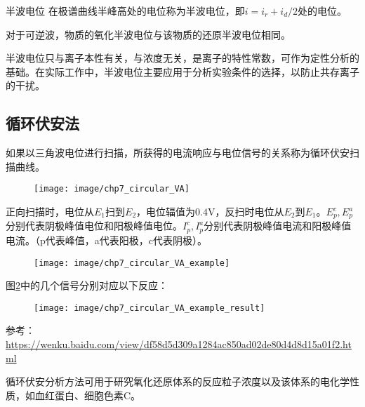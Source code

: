 \begin{definition*}{半波电位}{}
	在极谱曲线半峰高处的电位称为半波电位，即$i=i_r+i_d/2$处的电位。
	
	对于可逆波，物质的氧化半波电位与该物质的还原半波电位相同。	
\end{definition*}

半波电位只与离子本性有关，与浓度无关，是离子的特性常数，可作为定性分析的基础。在实际工作中，半波电位主要应用于分析实验条件的选择，以防止共存离子的干扰。

\subsection{循环伏安法}
如果以三角波电位进行扫描，所获得的电流响应与电位信号的关系称为循环伏安扫描曲线。
\begin{figure}[!h]
	\centering
	\texttt{[image: image/chp7\_circular\_VA]}
	\label{fig:chp7circularva}
\end{figure}

正向扫描时，电位从$E_1$扫到$E_2$，电位辐值为$0.4\mathrm{V}$，反扫时电位从$E_2$到$E_1$。$E_p^c,E_p^a$分别代表阴极峰值电位和阳极峰值电位。$I_p^c,I_p^a$分别代表阴极峰值电流和阳极峰值电流。（p代表峰值，a代表阳极，c代表阴极）。

\begin{example}
	\begin{figure}[!h]
		\centering
		\texttt{[image: image/chp7\_circular\_VA\_example]}
		\caption{}
		\label{fig:chp7circularvaexample}
	\end{figure}

	图\ref{fig:chp7circularvaexample}中的几个信号分别对应以下反应：
	
	\begin{figure}[!h]
		\centering
		\texttt{[image: image/chp7\_circular\_VA\_example\_result]}
		\label{fig:chp7circularvaexampleresult}
	\end{figure}
	
	参考：\url{https://wenku.baidu.com/view/df58d5d309a1284ac850ad02de80d4d8d15a01f2.html}
\end{example}
循环伏安分析方法可用于研究氧化还原体系的反应粒子浓度以及该体系的电化学性质，如血红蛋白、细胞色素C。
